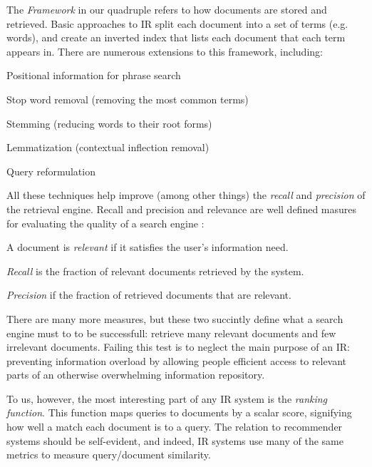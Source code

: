 The \emph{Framework} in our quadruple refers to how documents are stored and retrieved.
Basic approaches to IR split each document into a set of terms (e.g. words),
and create an inverted index \cite[p22]{Manning2008} that lists each document that each term appears in.
There are numerous extensions to this framework, including: 

\begin{itemize*}
  \item Positional information for phrase search \cite[p39]{Manning2008}
  \item Stop word removal (removing the most common terms) \cite[p27]{Manning2008}
  \item Stemming (reducing words to their root forms) \cite[p32]{Manning2008}
  \item Lemmatization (contextual inflection removal) \cite[p32]{Manning2008}
  \item Query reformulation \citep[p117]{Baeza-Yates1999}
\end{itemize*}

All these techniques help improve (among other things)
the \emph{recall} and \emph{precision} of the retrieval engine. 
Recall and precision and relevance are well defined masures for evaluating the quality of a search engine \cite[p5]{Manning2008}:

\begin{itemize*}
  \item A document is \emph{relevant} if it satisfies the user's information need.
  \item \emph{Recall} is the fraction of relevant documents retrieved by the system.
  \item \emph{Precision} if the fraction of retrieved documents that are relevant.
\end{itemize*}

There are many more measures, but these two succintly define what a search engine must to
to be successfull: retrieve many relevant documents and few irrelevant documents.
Failing this test is to neglect the main purpose of an IR:
preventing information overload by allowing people efficient access 
to relevant parts of an otherwise overwhelming information repository.

To us, however, the most interesting part of any IR system is the \emph{ranking function}.
This function maps queries to documents by a scalar score, signifying how well a match
each document is to a query. The relation to recommender systems should be self-evident,
and indeed, IR systems use many of the same metrics to measure query/document similarity.

